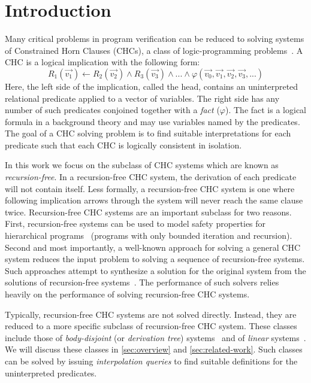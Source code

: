 \section{Introduction}
\label{sec:intro}
Many critical problems in program verification can be reduced to
solving systems of Constrained Horn Clauses (CHCs), a class of
logic-programming
problems~\cite{bjorner13,flanagan03,rummer13a,rummer13b}.
%
A CHC is a logical implication with the following form:
$$
  R_1(\vec{v_1}) \leftarrow R_2(\vec{v_2}) \land R_3(\vec{v_3}) \land
  ... \land \varphi(\vec{v_0}, \vec{v_1}, \vec{v_2}, \vec{v_3},...)
$$
Here, the left side of the implication, called the head, contains an
uninterpreted relational predicate applied to a vector of variables.
%
The right side has any number of such predicates conjoined together
with a \emph{fact} ($\varphi$). The fact is a logical formula in a background
theory and may use variables named by the predicates.
%
The goal of a CHC solving problem is to find suitable interpretations
for each predicate such that each CHC is logically
consistent in isolation.

In this work we focus on the subclass of CHC systems which are known
as \emph{recursion-free}. In a recursion-free CHC system, the
derivation of each predicate will not contain itself.
%
Less formally, a recursion-free CHC system is one where following
implication arrows through the system will never reach the same clause
twice.
%
Recursion-free CHC systems are an important subclass for two reasons.
%
First, recursion-free systems can be used to model safety properties
for hierarchical programs~\cite{lal-qadeer15,lal-qadeer-lahiri12}
(programs with only bounded iteration and recursion).
%
Second and most importantly, a well-known approach for solving a
general CHC system reduces the input problem to solving a sequence
of recursion-free systems.
%
Such approaches attempt to synthesize a solution for the   original
system from the solutions of recursion-free systems~\cite{bjorner13}.
%
The performance of such solvers relies
heavily on the performance of solving recursion-free CHC systems.
%

Typically, recursion-free CHC systems are not solved directly.
%
Instead, they are reduced to a more specific subclass of
recursion-free CHC system.
%
These classes include those of
\emph{body-disjoint} (or \emph{derivation tree})
systems~\cite{heizmann10,bjorner13,mcmillan14,rummer13a,rummer13b} and
of \emph{linear} systems~\cite{albarghouthi12a}.
%
We will discuss these classes in \autoref{sec:overview} and
\autoref{sec:related-work}.
%
Such classes can be solved by issuing
\emph{interpolation queries} to find suitable definitions for the
uninterpreted predicates.
%

